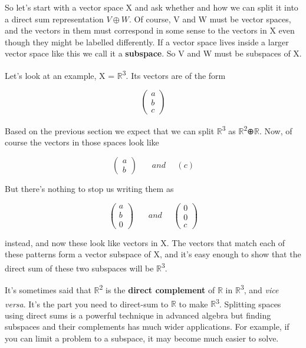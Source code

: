 \documentclass[oneside,english]{amsbook}
\numberwithin{section}{chapter}
\theoremstyle{plain}
\theoremstyle{definition}
\begin{document}
So let's start with a vector space X and ask whether and how we can
split it into a direct sum representation $V\oplus W$. Of course, V and W must
be vector spaces, and the vectors in them must correspond in some sense
to the vectors in X even though they might be labelled differently. If a
vector space lives inside a larger vector space like this we call it a
\textbf{subspace}. So V and W must be subspaces of X.

Let's look at an example, X = $\mathbb{R}$\textsuperscript{3}. Its vectors
are of the form

\[\begin{pmatrix}
	a \\
	b \\
	c
\end{pmatrix}\]

Based on the previous section we expect that we can split
$\mathbb{R}$\textsuperscript{3} as
$\mathbb{R}$\textsuperscript{2}⊕$\mathbb{R}$. Now, of course the vectors in
those spaces look like

\[\begin{pmatrix}
	a \\
	b
\end{pmatrix}\ \ \ \ \ \ \ \ and\ \ \ \ \ \ (c)\]

But there's nothing to stop us writing them as

\[\begin{pmatrix}
	a \\
	b \\
	0
\end{pmatrix}\ \ \ \ \ \ \ \ and\ \ \ \ \ \ \begin{pmatrix}
	0 \\
	0 \\
	c
\end{pmatrix}\]

instead, and now these look like vectors in X. The vectors that match
each of these patterns form a vector subspace of X, and it's easy enough
to show that the direct sum of these two subspaces will be
$\mathbb{R}$\textsuperscript{3}.

It's sometimes said that $\mathbb{R}$\textsuperscript{2} is the
\textbf{direct complement} of $\mathbb{R}$ in
$\mathbb{R}$\textsuperscript{3}, and \emph{vice versa}. It's the part you
need to direct-sum to $\mathbb{R}$ to make $\mathbb{R}$\textsuperscript{3}.
Splitting spaces using direct sums is a powerful technique in advanced
algebra but finding subspaces and their complements has much wider
applications. For example, if you can limit a problem to a subspace, it
may become much easier to solve.
\end{document}

